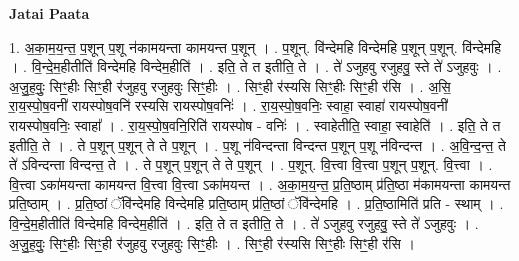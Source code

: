 \documentclass[17pt]{extarticle}
\begin{document}
\textbf{Jatai Paata} \newline

1. अ॒का॒म॒य॒न्त॒ प॒शून् प॒शू न॑कामयन्ता कामयन्त प॒शून् । . प॒शून्. वि॑न्देमहि विन्देमहि प॒शून् प॒शून्. वि॑न्देमहि । . वि॒न्दे॒म॒हीतीति॑ विन्देमहि विन्देम॒हीति॑ । . इति॒ ते त इतीति॒ ते । . ते॑ ऽजुहवु रजुहवु॒ स्ते ते॑ ऽजुहवुः । . अ॒जु॒ह॒वुः॒ सिꣳ॒॒हीः सिꣳ॒॒ही र॑जुहवु रजुहवुः सिꣳ॒॒हीः । . सिꣳ॒॒ही र॑स्यसि सिꣳ॒॒हीः सिꣳ॒॒ही र॑सि । . अ॒सि॒ रा॒य॒स्पो॒ष॒वनी॑ रायस्पोष॒वनि॑ रस्यसि रायस्पोष॒वनिः॑ । . रा॒य॒स्पो॒ष॒वनिः॒ स्वाहा॒ स्वाहा॑ रायस्पोष॒वनी॑ रायस्पोष॒वनिः॒ स्वाहा᳚ । . रा॒य॒स्पो॒ष॒वनि॒रिति॑ रायस्पोष - वनिः॑ । . स्वाहेतीति॒ स्वाहा॒ स्वाहेति॑ । . इति॒ ते त इतीति॒ ते । . ते प॒शून् प॒शून् ते ते प॒शून् । . प॒शू न॑विन्दन्ता विन्दन्त प॒शून् प॒शू न॑विन्दन्त । . अ॒वि॒न्द॒न्त॒ ते ते॑ ऽविन्दन्ता विन्दन्त॒ ते । . ते प॒शून् प॒शून् ते ते प॒शून् । . प॒शून्. वि॒त्त्वा वि॒त्त्वा प॒शून् प॒शून्. वि॒त्त्वा । . वि॒त्त्वा ऽका॑मयन्ता कामयन्त वि॒त्त्वा वि॒त्त्वा ऽका॑मयन्त । . अ॒का॒म॒य॒न्त॒ प्र॒ति॒ष्ठाम् प्र॑ति॒ष्ठा म॑कामयन्ता कामयन्त प्रति॒ष्ठाम् । . प्र॒ति॒ष्ठां ॅवि॑न्देमहि विन्देमहि प्रति॒ष्ठाम् प्र॑ति॒ष्ठां ॅवि॑न्देमहि । . प्र॒ति॒ष्ठामिति॑ प्रति - स्थाम् । . वि॒न्दे॒म॒हीतीति॑ विन्देमहि विन्देम॒हीति॑ । . इति॒ ते त इतीति॒ ते । . ते॑ ऽजुहवु रजुहवु॒ स्ते ते॑ ऽजुहवुः । . अ॒जु॒ह॒वुः॒ सिꣳ॒॒हीः सिꣳ॒॒ही र॑जुहवु रजुहवुः सिꣳ॒॒हीः । . सिꣳ॒॒ही र॑स्यसि सिꣳ॒॒हीः सिꣳ॒॒ही र॑सि । \newline
\end{document}
